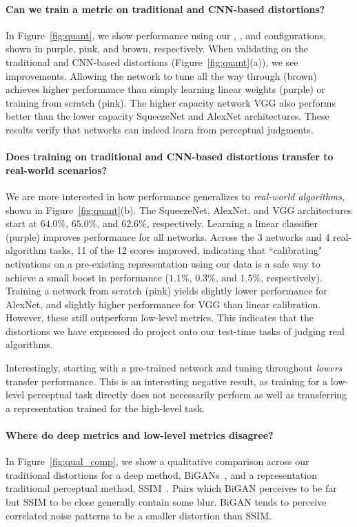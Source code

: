 \paragraph{Can we train a metric on traditional and CNN-based distortions?} In Figure~\ref{fig:quant}, we show performance using our , , and  configurations, shown in purple, pink, and brown, respectively. When validating on the traditional and CNN-based distortions (Figure~\ref{fig:quant}(a)), we see improvements. Allowing the network to tune all the way through (brown) achieves higher performance than simply learning linear weights (purple) or training from scratch (pink). The higher capacity network VGG also performs better than the lower capacity SqueezeNet and AlexNet architectures. These results verify that networks can indeed learn from perceptual judgments.

\paragraph{Does training on traditional and CNN-based distortions transfer to real-world scenarios?} We are more interested in how performance generalizes to \textit{real-world algorithms}, shown in Figure~\ref{fig:quant}(b). The SqueezeNet, AlexNet, and VGG architectures start at $64.0\%$, $65.0\%$, and $62.6\%$, respectively. Learning a linear classifier (purple) improves performance for all networks. Across the 3 networks and 4 real-algorithm tasks, 11 of the 12 scores improved, indicating that ``calibrating" activations on a pre-existing representation using our data is a safe way to achieve a small boost in performance ($1.1\%$, $0.3\%$, and $1.5\%$, respectively). Training a network from scratch (pink) yields slightly lower performance for AlexNet, and slightly higher performance for VGG than linear calibration. However, these still outperform low-level metrics. This indicates that the distortions we have expressed do project onto our test-time tasks of judging real algorithms. 

Interestingly, starting with a pre-trained network and tuning throughout \textit{lowers} transfer performance. This is an interesting negative result, as training for a low-level perceptual task directly does not necessarily perform as well as transferring a representation trained for the high-level task.

\paragraph{Where do deep metrics and low-level metrics disagree?} In Figure~\ref{fig:qual_comp}, we show a qualitative comparison across our traditional distortions for a deep method, BiGANs~\cite{donahue2016adversarial}, and a representation traditional perceptual method, SSIM~\cite{wang2004image}. Pairs which BiGAN perceives to be far but SSIM to be close generally contain some blur. BiGAN tends to perceive correlated noise patterns to be a smaller distortion than SSIM.
